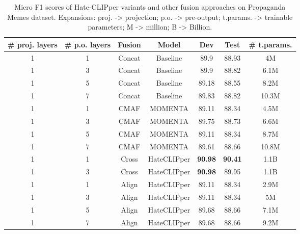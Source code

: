 \documentclass[11pt]{article}
\begin{document}
\begin{table*}[!h]
\centering
\begin{tabular}{|c|c|c|c|c|c|c|}
\hline
\textbf{\# proj. layers} &
  \textbf{\# p.o. layers} &
  \textbf{Fusion} &
  \textbf{Model} &
  \textbf{Dev} &
  \textbf{Test} &
  \textbf{\# t.params.} \\
\hline
1          & 1             & Concat & Baseline                                   & 89.9          & 88.93 &4M \\
1          & 3             & Concat & Baseline                                   & 89.9          & 88.82  & 6.1M        \\
1          & 5             & Concat & Baseline                                   & 89.18          & 88.55     &8.2M      \\
1          & 7             & Concat & Baseline                                   & 89.83          & 88.82     &10.3M     \\
\hline
1          & 1             & CMAF & MOMENTA                                   & 89.11         & 88.34   &4.5M      \\
1          & 3             & CMAF & MOMENTA                                   & 89.75          & 88.73   & 6.6M       \\
1          & 5             & CMAF & MOMENTA                                   & 89.11           & 88.34  & 8.7M          \\
1          & 7             & CMAF & MOMENTA                                   & 89.61          & 88.66 &10.8M        \\
\hline
1          & 1             & Cross  & HateCLIPper                                & \textbf{90.98} & \textbf{90.41}   &1.1B      \\
1          & 3             & Cross  & HateCLIPper                                &\textbf{90.98}         & 89.95        &1.1B \\
\hline
1          & 1             & Align  & HateCLIPper                                & 89.11         & 88.34   &2.9M      \\
1          & 3             & Align  & HateCLIPper                                & 89.11         & 88.34        &5M     \\
1          & 5             & Align  & HateCLIPper                                & 89.68          & 88.66 & 7.1M \\
1          & 7             & Align  & HateCLIPper                                & 89.68          & 88.66       &9.2M \\
\hline
\end{tabular}
\caption{Micro F1 scores of Hate-CLIPper variants and other fusion approaches on Propaganda Memes dataset. Expansions: proj. -> projection; p.o. -> pre-output; t.params. -> trainable parameters; M -> million; B -> Billion.}
\label{tab:result-prop}
\end{table*}
\end{document}
